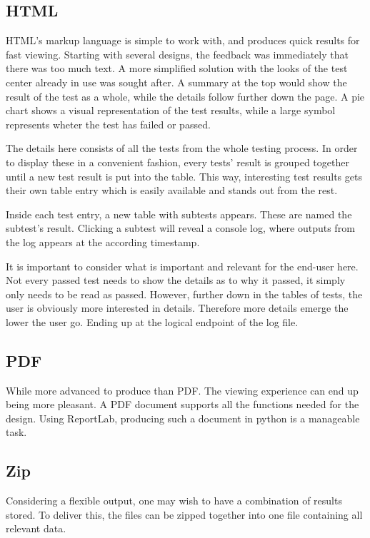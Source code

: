 \documentclass{article}
\begin{document}
	\subsection{HTML}
	HTML's markup language is simple to work with, and produces quick results for fast viewing. Starting with several designs, the feedback was immediately that there was too much text. A more simplified solution with the looks of the test center already in use was sought after. A summary at the top would show the result of the test as a whole, while the details follow further down the page. A pie chart shows a visual representation of the test results, while a large symbol represents wheter the test has failed or passed.
	
	The details here consists of all the tests from the whole testing process. In order to display these in a convenient fashion, every tests' result is grouped together until a new test result is put into the table. This way, interesting test results gets their own table entry which is easily available and stands out from the rest. 
	
	Inside each test entry, a new table with subtests appears. These are named the subtest's result. Clicking a subtest will reveal a console log, where outputs from the log appears at the according timestamp.
	
	It is important to consider what is important and relevant for the end-user here. Not every passed test needs to show the details as to why it passed, it simply only needs to be read as passed. However, further down in the tables of tests, the user is obviously more interested in details. Therefore more details emerge the lower the user go. Ending up at the logical endpoint of the log file. 
	\subsection{PDF}
	While more advanced to produce than PDF. The viewing experience can end up being more pleasant. A PDF document supports all the functions needed for the design. Using ReportLab, producing such a document in python is a manageable task. 
	\subsection{Zip}
	Considering a flexible output, one may wish to have a combination of results stored. To deliver this, the files can be zipped together into one file containing all relevant data. 
	
	\pagebreak
	
\end{document}
